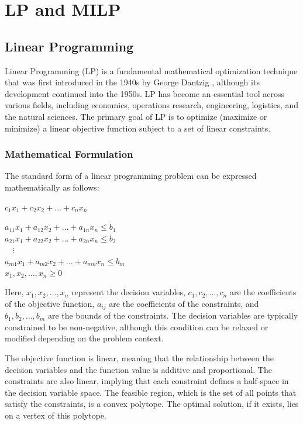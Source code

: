 \section{LP and MILP}

\subsection{Linear Programming}
Linear Programming (LP) is a fundamental mathematical optimization technique that was first introduced in the 1940s by George Dantzig \cite{dantzig2002linear}, although its development continued into the 1950s. LP has become an essential tool across various fields, including economics, operations research, engineering, logistics, and the natural sciences. The primary goal of LP is to optimize (maximize or minimize) a linear objective function subject to a set of linear constraints.

\subsubsection{Mathematical Formulation}
The standard form of a linear programming problem can be expressed mathematically as follows:

\begin{center}
    $c_1x_1 + c_2x_2 + \dots + c_nx_n $
\end{center}
\begin{center}
    $  a_{11}x_1 + a_{12}x_2 + \dots + a_{1n}x_n \leq b_1 $ \\
    $ a_{21}x_1 + a_{22}x_2 + \dots + a_{2n}x_n \leq b_2 $ \\
    $ \quad \vdots $ \\
    $ a_{m1}x_1 + a_{m2}x_2 + \dots + a_{mn}x_n \leq b_m $ \\
    $ x_{1}, x_{2}, \dots, x_n \geq 0 $
\end{center}

Here, $ x_1, x_2, \dots, x_n $ represent the decision variables, $ c_1, c_2, \dots, c_n $ are the coefficients of the objective function, $ a_{ij} $ are the coefficients of the constraints, and $ b_1, b_2, \dots, b_m $ are the bounds of the constraints. The decision variables are typically constrained to be non-negative, although this condition can be relaxed or modified depending on the problem context.

The objective function is linear, meaning that the relationship between the decision variables and the function value is additive and proportional. The constraints are also linear, implying that each constraint defines a half-space in the decision variable space. The feasible region, which is the set of all points that satisfy the constraints, is a convex polytope. The optimal solution, if it exists, lies on a vertex of this polytope.


